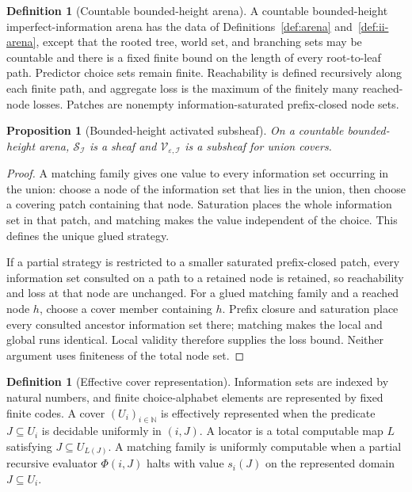 \documentclass[11pt]{article}
\theoremstyle{plain}
\newtheorem{proposition}[theorem]{Proposition}
\theoremstyle{definition}
\newtheorem{definition}[theorem]{Definition}
\theoremstyle{remark}
\newcommand{\N}{\mathbb{N}}
\newcommand{\eps}{\varepsilon}
\begin{document}
\begin{definition}[Countable bounded-height arena]
\label{def:countable-bounded-arena}
A countable bounded-height imperfect-information arena has the data of
Definitions~\ref{def:arena} and~\ref{def:ii-arena}, except that the rooted tree,
world set, and branching sets may be countable and there is a fixed finite bound
on the length of every root-to-leaf path. Predictor choice sets remain finite.
Reachability is defined recursively along each finite path, and aggregate loss
is the maximum of the finitely many reached-node losses. Patches are nonempty
information-saturated prefix-closed node sets.
\end{definition}

\begin{proposition}[Bounded-height activated subsheaf]
\label{prop:bounded-activated-sheaf}
On a countable bounded-height arena,
$\mathscr S_{\mathcal I}$ is a sheaf and
$\mathscr V_{\eps,\mathcal I}$ is a subsheaf for union covers.
\end{proposition}

\begin{proof}
A matching family gives one value to every information set occurring in the
union: choose a node of the information set that lies in the union, then choose a
covering patch containing that node. Saturation places the whole information set
in that patch, and matching makes the value
independent of the choice. This defines the unique glued strategy.

If a partial strategy is restricted to a smaller saturated prefix-closed patch,
every information set consulted on a path to a retained node is retained, so
reachability and loss at that node are unchanged. For a glued matching family
and a reached node $h$, choose a cover member containing $h$. Prefix closure and
saturation place every consulted ancestor information set there; matching makes
the local and global runs identical. Local validity therefore supplies the loss
bound. Neither argument uses finiteness of the total node set.
\end{proof}

\begin{definition}[Effective cover representation]
\label{def:effective-cover-representation}
Information sets are indexed by natural numbers, and finite choice-alphabet
elements are represented by fixed finite codes. A cover $(U_i)_{i\in\N}$ is
effectively represented when the predicate $J\subseteq U_i$ is decidable
uniformly in $(i,J)$. A locator is a total computable map $L$ satisfying
$J\subseteq U_{L(J)}$. A matching family is uniformly computable when a partial
recursive evaluator $\Phi(i,J)$ halts with value $s_i(J)$ on the represented
domain $J\subseteq U_i$.
\end{definition}
\end{document}
